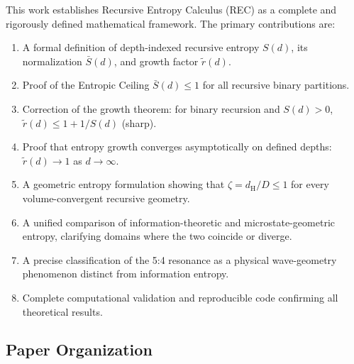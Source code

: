 \documentclass[11pt,a4paper]{article}
\theoremstyle{definition}
\theoremstyle{remark}
\newcommand{\dH}{d_{\mathrm{H}}}
\newcommand{\Sbar}{\bar{S}}
\newcommand{\rtilde}{\tilde{r}}
\begin{document}
This work establishes Recursive Entropy Calculus (REC) as a complete and 
rigorously defined mathematical framework. The primary contributions are:

\begin{enumerate}[label=(C\arabic*), leftmargin=*]
    \item A formal definition of depth-indexed recursive entropy $S(d)$, its 
          normalization $\Sbar(d)$, and growth factor $\rtilde(d)$.
    \item Proof of the Entropic Ceiling $\Sbar(d)\le 1$ for all recursive 
          binary partitions.
    \item Correction of the growth theorem: for binary recursion and $S(d)>0$,
          $\rtilde(d)\le 1 + 1/S(d)$ (sharp).
    \item Proof that entropy growth converges asymptotically on defined depths:
          $\rtilde(d)\rightarrow 1$ as $d\rightarrow\infty$.
    \item A geometric entropy formulation showing that $\zeta = \dH/D \le 1$
          for every volume-convergent recursive geometry.
    \item A unified comparison of information-theoretic and microstate-geometric
          entropy, clarifying domains where the two coincide or diverge.
    \item A precise classification of the 5:4 resonance as a physical
          wave-geometry phenomenon distinct from information entropy.
    \item Complete computational validation and reproducible code confirming
          all theoretical results.
\end{enumerate}

\subsection{Paper Organization}
\end{document}

